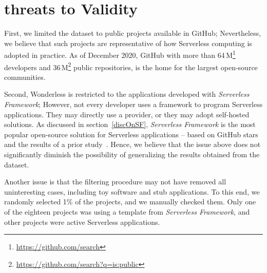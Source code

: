 \section{threats to Validity}
\label{limitations}

%

First, we limited the dataset to public projects available in GitHub; 
Nevertheless, we believe that such projects are representative of 
how Serverless computing is adopted in practice.
As of December 2020, 
GitHub with more than 64\,M\footnote{\url{https://github.com/search}} 
developers and 36\,M\footnote{\url{https://github.com/search?q=is:public}} public 
repositories, is the home for the largest open-source communities. 
%

Second, Wonderless is restricted to the applications 
developed with \emph{Serverless Framework}; 
However, not every developer uses a framework to program Serverless applications. 
They may directly use a provider, or they may adopt self-hosted solutions. 
%
As discussed in section~\ref{discOnSF}, \emph{Serverless Framework} is the 
most popular open-source solution for Serverless applications -- 
based on GitHub stars and the results of a prior study~\cite{kritikos2018review}. 
Hence, we believe that the issue above does not significantly diminish 
the possibility of generalizing the results obtained from the dataset.

Another issue is that the filtering procedure may not have removed all 
uninteresting cases, including toy software and stub applications.
To this end, we randomly selected 1\% of the projects, 
and we manually checked them. 
Only one of the eighteen projects was using a template from \emph{Serverless Framework}, 
and other projects were active Serverless applications.








